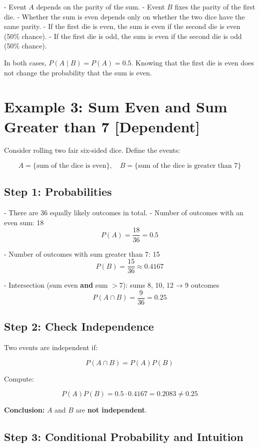 \documentclass[12pt]{article}
\begin{document}
- Event \(A\) depends on the parity of the sum.  
- Event \(B\) fixes the parity of the first die.  
- Whether the sum is even depends only on whether the two dice have the same parity.  
- If the first die is even, the sum is even if the second die is even (50\% chance).  
- If the first die is odd, the sum is even if the second die is odd (50\% chance).  

In both cases, \(P(A \mid B) = P(A) = 0.5\).  
Knowing that the first die is even does not change the probability that the sum is even.

\section*{Example 3: Sum Even and Sum Greater than 7 [Dependent]}

Consider rolling two fair six-sided dice. Define the events:

\[
A = \{\text{sum of the dice is even}\}, \quad
B = \{\text{sum of the dice is greater than 7}\}
\]

\subsection*{Step 1: Probabilities}

- There are 36 equally likely outcomes in total.  
- Number of outcomes with an even sum: 18  
\[
P(A) = \frac{18}{36} = 0.5
\]

- Number of outcomes with sum greater than 7: 15  
\[
P(B) = \frac{15}{36} \approx 0.4167
\]

- Intersection (sum even \textbf{and} sum $> 7$): sums 8, 10, 12 → 9 outcomes  
\[
P(A \cap B) = \frac{9}{36} = 0.25
\]

\subsection*{Step 2: Check Independence}

Two events are independent if:

\[
P(A \cap B) = P(A)P(B)
\]

Compute:

\[
P(A)P(B) = 0.5 \cdot 0.4167 = 0.2083 \neq 0.25
\]

\textbf{Conclusion:} \(A\) and \(B\) are \textbf{not independent}.

\subsection*{Step 3: Conditional Probability and Intuition}
\end{document}
